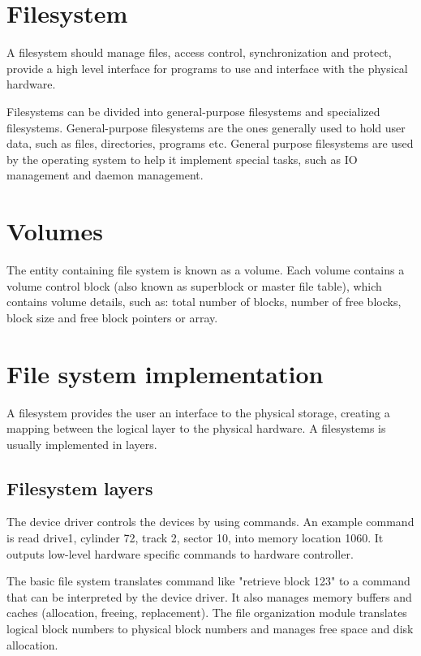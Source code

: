 \section{Filesystem}
A filesystem should manage files, access control, synchronization and protect, provide a high level interface for programs to use and interface with the physical hardware.

Filesystems can be divided into general-purpose filesystems and specialized filesystems. General-purpose filesystems are the ones generally used to hold user data, such as files, directories, programs etc. General purpose filesystems are used by the operating system to help it implement special tasks, such as IO management and daemon management.

\section{Volumes}
The entity containing file system is known as a volume. Each volume contains a volume control block (also known as superblock or master file table), which contains volume details, such as: total number of blocks, number of free blocks, block size and free block pointers or array.

\section{File system implementation}
A filesystem provides the user an interface to the physical storage, creating a mapping between the logical layer to the physical hardware. A filesystems is usually implemented in layers.


\subsection{Filesystem layers}
The device driver controls the devices by using commands. An example command is read drive1, cylinder 72, track 2, sector 10, into memory location 1060. It outputs low-level hardware specific commands to hardware
controller.

The basic file system translates command like "retrieve block 123" to a command that can be interpreted by the device driver. It also manages memory buffers and caches (allocation, freeing, replacement). The file organization module translates logical block numbers to physical block numbers and manages free space and disk allocation. 

